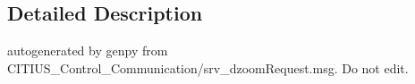 \subsection{\-Detailed \-Description}
\begin{DoxyVerb}autogenerated by genpy from CITIUS_Control_Communication/srv_dzoomRequest.msg. Do not edit.\end{DoxyVerb}
 